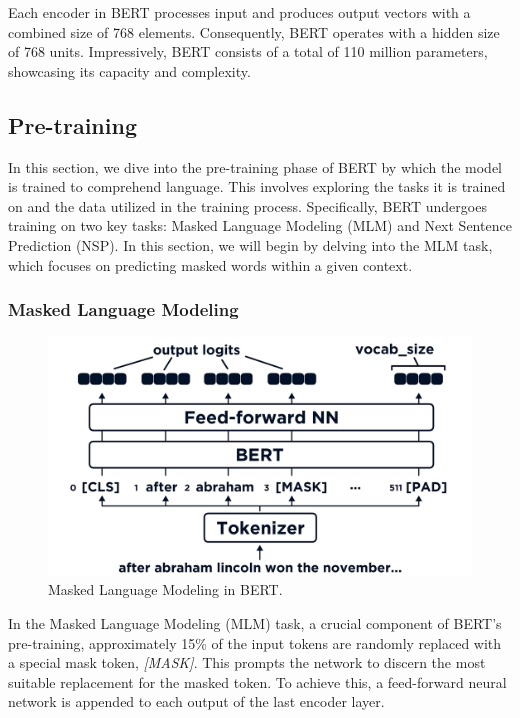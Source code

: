 \documentclass[a4paper,12pt]{report} %
\begin{document}
Each encoder in BERT processes input and produces output vectors with a combined size of 768 elements. Consequently, BERT operates with a hidden size of 768 units. Impressively, BERT consists of a total of 110 million parameters, showcasing its capacity and complexity.


\subsection{Pre-training}
In this section, we dive into the pre-training phase of BERT by which the model is trained to comprehend language. This involves exploring the tasks it is trained on and the data utilized in the training process. Specifically, BERT undergoes training on two key tasks: Masked Language Modeling (MLM) and Next Sentence Prediction (NSP). In this section, we will begin by delving into the MLM task, which focuses on predicting masked words within a given context.

\subsubsection{Masked Language Modeling}
\begin{figure}
  \centering
  \includegraphics[width=12cm]{img/mlm_bert.png} %
  \caption{Masked Language Modeling in BERT.}
  \label{fig:mlm_bert}
\end{figure}
In the Masked Language Modeling (MLM) task, a crucial component of BERT's pre-training, approximately 15\% of the input tokens are randomly replaced with a special mask token, \textit{[MASK]}. This prompts the network to discern the most suitable replacement for the masked token. To achieve this, a feed-forward neural network is appended to each output of the last encoder layer.
\end{document}
